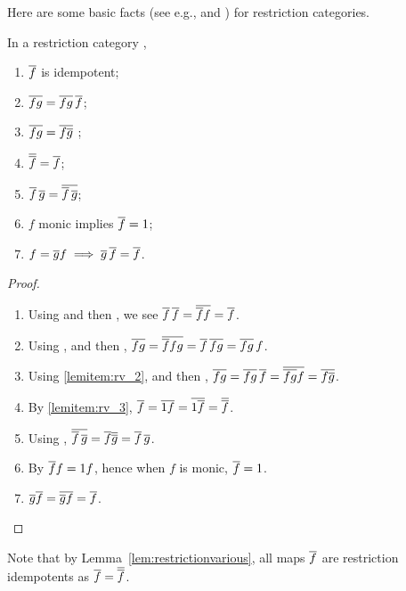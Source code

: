 Here are some basic facts (see e.g., \cite{cockett2002:restcategories1} and
\cite{cockett-manes09-boolean-classical-rest-cats}) for restriction categories.

\begin{lemma}\label{lem:restrictionvarious}
  In a restriction category \X,
  \begin{multicols}{2}
    \begin{enumerate}[{(}i{)}]
      \item{}$\overline{f}$ is idempotent;
      \item{} $\overline{f g} = \overline{f g} \, \overline{f}$;\label{lemitem:rv_2}
      \item{} $\overline{f g} = \overline{f \overline{g}}$ ;\label{lemitem:rv_3}
      \item{} $\overline{\overline{f}} = \overline{f}$;
      \item{} $\overline{f}\,\overline{g} = \overline{\overline{f}\,\overline{g}}$;
      \item{} $f$ monic implies $\overline{f} = 1$;
      \item{} $f = \overline{g} f \implies \overline{g}\,\overline{f} = \overline{f}$.
      \\
    \end{enumerate}
  \end{multicols}
\end{lemma}
\begin{proof}
  \prepprooflist
  \begin{enumerate}[{(}i{)}]
    \item Using \rthree and then \rone, we see $\overline{f}\,\overline{f} = \overline{\overline{f} f} = \overline{f}$.
    \item Using \rone, \rthree and then \rtwo, $\overline{f g} = \overline{\overline{f} f g} = \overline{f}\,\overline{f g} =
      \overline{f g}\, f$.
    \item Using \ref{lemitem:rv_2}, \rthree and then \rfour, $\overline{f g} = \overline{f g}\,\overline{f} =
      \overline{\overline{f g} f} = \overline{f\overline{g}}$.
    \item By \ref{lemitem:rv_3}, $\overline{f} = \overline{1 f} = \overline{1 \overline{f}} = \overline{\overline{f}}$.
    \item Using \rthree, $\overline{\overline{f}\,\overline{g}} = \overline{f}\overline{\overline{g}} = \overline{f}\,\overline{g}$.
    \item By \rone $\overline{f} f = 1 f$, hence when $f$ is monic, $\overline{f} = 1$.
    \item $\overline{g}\overline{f} = \overline{\overline{g} f} = \overline{f}$.
  \end{enumerate}
\end{proof}

Note that by Lemma~\ref{lem:restrictionvarious}, all maps $\overline{f}$ are restriction idempotents
as $\overline{f}=\overline{\overline{f}}$.


